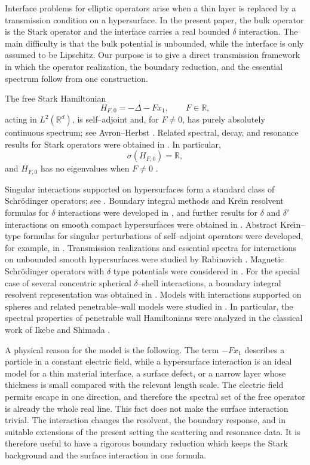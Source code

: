 \documentclass[a4paper,11pt]{article}
\numberwithin{equation}{section}
\theoremstyle{remark}
\theoremstyle{definition}
\theoremstyle{remark}
\begin{document}
Interface problems for elliptic operators arise when a thin layer is replaced by a transmission condition on a hypersurface.
In the present paper, the bulk operator is the Stark operator and the interface carries a real bounded $\delta$ interaction.
The main difficulty is that the bulk potential is unbounded, while the interface is only assumed to be Lipschitz.
Our purpose is to give a direct transmission framework in which the operator realization, the boundary reduction, and the essential spectrum follow from one construction.

The free Stark Hamiltonian
$$
H_{F,0}=-\Delta-Fx_1,\qquad F\in\mathbb R,
$$
acting in $L^2(\mathbb R^d)$, is self--adjoint and, for $F\ne0$, has purely absolutely continuous spectrum; see Avron--Herbst \cite{AvronHerbst1977}.
Related spectral, decay, and resonance results for Stark operators were obtained in \cite{BentoselaEtAl1983,Herbst1979,Herbst1980}.
In particular,
$$
\sigma(H_{F,0})=\mathbb R,
$$
and $H_{F,0}$ has no eigenvalues when $F\ne0$ \cite{AvronHerbst1977}.

Singular interactions supported on hypersurfaces form a standard class of Schr\"odinger operators; see \cite{AGHH}.
Boundary integral methods and Kre\u{\i}n resolvent formulas for $\delta$ interactions were developed in \cite{BEKS1994}, and further results for $\delta$ and $\delta'$ interactions on smooth compact hypersurfaces were obtained in \cite{BehrndtLangerLotoreichik2013}.
Abstract Kre\u{\i}n--type formulas for singular perturbations of
self--adjoint operators were developed, for example, in
\cite{Posilicano2001}.
Transmission realizations and essential spectra for interactions on unbounded smooth hypersurfaces were studied by Rabinovich \cite{Rabinovich2019}.
Magnetic Schr\"odinger operators with $\delta$ type potentials were considered in \cite{Rabinovich2021}.
For the special case of several concentric spherical $\delta$--shell interactions, a boundary integral resolvent representation was obtained in \cite{KaminagaAAMP}.
Models with interactions supported on spheres and related penetrable--wall models were studied in \cite{AntoineGesztesyShabani1987,HounkonnouHounkpeShabani1997,IkebeShimada1991,Shabani1988JMP,Shabani1988NCB,Shimada1992,Shimada1994}.
In particular, the spectral properties of penetrable wall Hamiltonians were analyzed in the classical work of Ikebe and Shimada \cite{IkebeShimada1991}.

A physical reason for the model is the following.
The term $-Fx_1$ describes a particle in a constant electric field, while a hypersurface interaction is an ideal model for a thin material interface, a surface defect, or a narrow layer whose thickness is small compared with the relevant length scale.
The electric field permits escape in one direction, and therefore the spectral set of the free operator is already the whole real line.
This fact does not make the surface interaction trivial.
The interaction changes the resolvent, the boundary response, and in suitable extensions of the present setting the scattering and resonance data.
It is therefore useful to have a rigorous boundary reduction which keeps the Stark background and the surface interaction in one formula.
\end{document}
